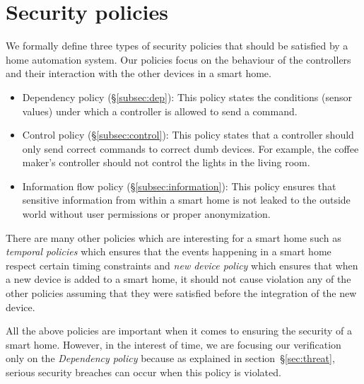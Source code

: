 \documentclass{article}
\begin{document}
\section{Security policies}
\label{sec:policies}
We formally define three types of security policies that should be satisfied by a home automation system. Our policies focus on the behaviour of the controllers and their interaction with the other devices in a smart home. 
\begin{itemize}
\item Dependency policy (\S\ref{subsec:dep}): This policy states the  conditions (sensor values) under which a controller is allowed to send a command.

\item Control policy (\S\ref{subsec:control}): This policy states that a controller should only send correct commands to correct dumb devices. For example, the coffee maker's controller should not control the lights in the living room.

\item Information flow policy (\S\ref{subsec:information}): This policy ensures that sensitive information from within a smart home is not leaked to the outside world without user permissions or proper anonymization. 
\end{itemize}
There are many other policies which are interesting for a smart home such as \textit{temporal policies} which ensures that the events happening in a smart home respect certain timing constraints and \textit{new device policy} which ensures that when a new device is added to a smart home, it should not cause violation any of the other policies assuming that they were satisfied before the integration of the new device.

All the above policies are important when it comes to ensuring the security of a smart home. However, in the interest of time, we are focusing our verification only on the \textit{Dependency policy} because as explained in section~\S\ref{sec:threat}, serious security breaches can occur when this policy is violated. 
\end{document}
